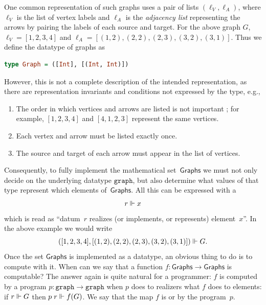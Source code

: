 One common representation of such graphs uses a pair of lists
$(\ell_V, \ell_A)$, where $\ell_V$ is the list of vertex labels and
$\ell_A$ is the \emph{adjacency list} representing the arrows by
pairing the labels of each source and target. For the above graph $G$,
$\ell_V = [1, 2, 3, 4]$ and $\ell_A = [(1,2), (2,2), (2,3), (3,2),
(3,1)]$.
%
Thus we define the datatype of graphs as
%
\begin{lstlisting}[language=Haskell]
type Graph = ([Int], [(Int, Int)])
\end{lstlisting}
%
However, this is not a complete description of the intended
representation, as there are representation invariants and conditions
not expressed by the type, e.g.,
%
\begin{enumerate}
\item The order in which vertices and arrows are listed is not
  important%
; for example, $[1,2,3,4]$ and $[4,1,2,3]$ represent the same vertices.
\item Each vertex and arrow must be listed exactly once.
\item The source and target of each arrow must appear in the list of vertices.
\end{enumerate}
%
Consequently, to fully implement the mathematical
set~$\mathsf{Graphs}$ we must not only decide on the underlying
datatype $\mathtt{graph}$, but also determine what values of that type
represent which elements of~$\mathsf{Graphs}$. All this can be
expressed with a 
%
\begin{equation*}
  r \Vdash x
\end{equation*}
%
which is read as ``datum~$r$ realizes (or implements, or represents)
element~$x$''. In the above example we would write
%
\begin{equation*}
([1, 2, 3, 4], [(1,2), (2,2), (2,3), (3,2), (3,1)]) \Vdash G.
\end{equation*}
%
Once the set $\mathsf{Graphs}$ is implemented as a datatype, an
obvious thing to do is to compute with it. When can we say that a
function $f : \mathsf{Graphs} \to \mathsf{Graphs}$ is computable? The
answer again is quite natural for a programmer: $f$ is computed by a
program $p : \mathtt{graph} \to \mathtt{graph}$ when $p$ does to
realizers what $f$ does to elements: if $r \Vdash G$ then $p \; r \Vdash
f(G)$. We say that the map $f$ is  or  by
the program~$p$.

